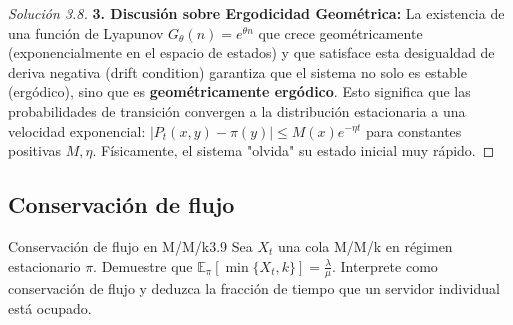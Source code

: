 \documentclass[10pt,a4paper]{article}
\begin{document}
\begin{proof}[Solución 3.8]
    \textbf{3. Discusión sobre Ergodicidad Geométrica:}
    La existencia de una función de Lyapunov $G_\theta(n) = e^{\theta n}$ que crece geométricamente (exponencialmente en el espacio de estados) y que satisface esta desigualdad de deriva negativa (drift condition) garantiza que el sistema no solo es estable (ergódico), sino que es \textbf{geométricamente ergódico}. 
    Esto significa que las probabilidades de transición convergen a la distribución estacionaria a una velocidad exponencial: $|P_t(x, y) - \pi(y)| \le M(x) e^{-\eta t}$ para constantes positivas $M, \eta$. Físicamente, el sistema "olvida" su estado inicial muy rápido.
\end{proof}


\newpage
\subsection{Conservación de flujo}


\begin{ejercicio}{Conservación de flujo en M/M/k}{3.9}
    Sea $X_t$ una cola M/M/k en régimen estacionario $\pi$. Demuestre que $\mathbb{E}_\pi[\min\{X_t, k\}] = \frac{\lambda}{\mu}$. Interprete como conservación de flujo y deduzca la fracción de tiempo que un servidor individual está ocupado.
\end{ejercicio}
\end{document}
